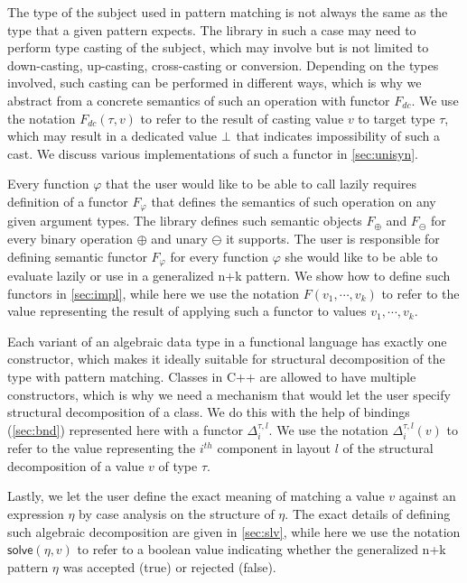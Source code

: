 \noindent
The type of the subject used in pattern matching is not always the same as the 
type that a given pattern expects. The library in such a case may need to 
perform type casting of the subject, which may involve but is not limited to 
down-casting, up-casting, cross-casting or conversion. Depending on the types 
involved, such casting can be performed in different ways, which is why we 
abstract from a concrete semantics of such an operation with functor $F_{dc}$. 
We use the notation $F_{dc}(\tau,v)$ to refer to the result of casting value $v$ 
to target type $\tau$, which may result in a dedicated value $\bot$ that 
indicates impossibility of such a cast. We discuss various implementations of 
such a functor in \textsection\ref{sec:unisyn}.

Every function $\varphi$ that the user would like to be able to call lazily 
requires definition of a functor $F_\varphi$ that defines the semantics of such 
operation on any given argument types. The library defines such semantic objects 
$F_\oplus$ and $F_\ominus$ for every binary operation $\oplus$ and unary 
$\ominus$ it supports. The user is responsible for defining semantic functor 
$F_\varphi$ for every function $\varphi$ she would like to be able to evaluate 
lazily or use in a generalized n+k pattern. We show how to define such functors 
in \textsection\ref{sec:impl}, while here we use the notation $F(v_1,\cdots,v_k)$ 
to refer to the value representing the result of applying such a functor to 
values $v_1,\cdots,v_k$.

Each variant of an algebraic data type in a functional language has exactly one 
constructor, which makes it ideally suitable for structural decomposition of the 
type with pattern matching. Classes in C++ are allowed to have multiple 
constructors, which is why we need a mechanism that would let the user specify 
structural decomposition of a class. We do this with the help of bindings 
(\textsection\ref{sec:bnd}) represented here with a functor $\Delta_i^{\tau,l}$. 
We use the notation $\Delta_i^{\tau,l}(v)$ to refer to the value representing 
the $i^{th}$ component in layout $l$ of the structural decomposition of a value 
$v$ of type $\tau$.

Lastly, we let the user define the exact meaning of matching a value $v$ against 
an expression $\eta$ by case analysis on the structure of $\eta$. The exact 
details of defining such algebraic decomposition are given in 
\textsection\ref{sec:slv}, while here we use the notation $\mathsf{solve}(\eta,v)$ 
to refer to a boolean value indicating whether the generalized n+k pattern 
$\eta$ was accepted (true) or rejected (false).

